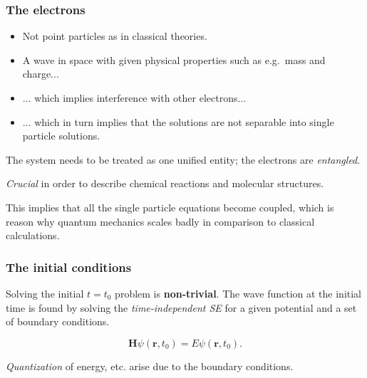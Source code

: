 \documentclass[
paper=128mm:96mm, %
fontsize=11pt, %
pagesize, %
parskip=half-, %
]{scrartcl} %
\theoremstyle{mythmstyle} %
\begin{document}
\clearpage


\subsubsection*{The electrons}

\begin{itemize}
\item  Not point particles as in classical theories.
\item  A wave in space with given physical properties such as e.g.~mass and charge...
\item  ... which implies interference with other electrons...
\item  ... which in turn implies that the solutions are not separable into single particle solutions.
\end{itemize}

\clearpage


The system needs to be treated as one unified entity; the electrons are \textit{entangled}.

\vspace{0.5cm}

\textit{Crucial} in order to describe chemical reactions and molecular structures. 

\vspace{0.5cm}

This implies that all the single particle equations become coupled, which is reason why quantum mechanics scales badly in comparison to classical calculations.


\clearpage

\subsubsection*{The initial conditions}

Solving the initial $t=t_0$ problem is \textbf{non-trivial}. The wave function at the initial time is found by solving the \textit{time-independent SE} for a given potential and a set of boundary conditions.

\begin{equation*}
 \mathbf{H}\psi(\mathbf{r}, t_0) = E\psi(\mathbf{r}, t_0).
\end{equation*}

\textit{Quantization} of energy, etc. arise due to the boundary conditions.
\end{document}
